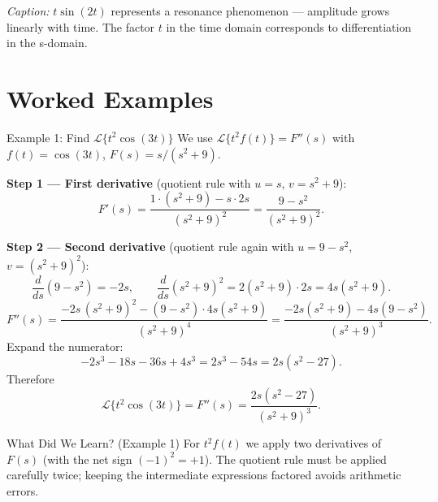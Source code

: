 \documentclass[12pt,a4paper]{article}
\begin{document}
\begin{center}
\end{center}

\noindent
\textit{Caption:} $t\sin(2t)$ represents a resonance phenomenon --- amplitude
grows linearly with time. The factor $t$ in the time domain corresponds to
differentiation in the s-domain.

\section{Worked Examples}

\begin{infobox}{Example 1: Find $\mathcal{L}\{t^2\cos(3t)\}$}
We use $\mathcal{L}\{t^2 f(t)\} = F''(s)$ with $f(t)=\cos(3t)$,
$F(s)=s/(s^2+9)$.

\textbf{Step 1 --- First derivative} (quotient rule with $u=s$, $v=s^2+9$):
\[
  F'(s) = \frac{1\cdot(s^2+9)-s\cdot 2s}{(s^2+9)^2}
         = \frac{9-s^2}{(s^2+9)^2}.
\]

\textbf{Step 2 --- Second derivative} (quotient rule again with
$u=9-s^2$, $v=(s^2+9)^2$):
\[
  \frac{d}{ds}(9-s^2)= -2s, \qquad
  \frac{d}{ds}(s^2+9)^2 = 2(s^2+9)\cdot 2s = 4s(s^2+9).
\]
\[
  F''(s)
  = \frac{-2s\,(s^2+9)^2 - (9-s^2)\cdot 4s(s^2+9)}{(s^2+9)^4}
  = \frac{-2s(s^2+9) - 4s(9-s^2)}{(s^2+9)^3}.
\]
Expand the numerator:
\[
  -2s^3-18s - 36s+4s^3 = 2s^3-54s = 2s(s^2-27).
\]
Therefore
\[
  \boxed{\mathcal{L}\{t^2\cos(3t)\} = F''(s) = \frac{2s(s^2-27)}{(s^2+9)^3}.}
\]
\end{infobox}
\begin{learnbox}{What Did We Learn? (Example 1)}
For $t^2 f(t)$ we apply two derivatives of $F(s)$ (with the net sign
$(-1)^2=+1$). The quotient rule must be applied carefully twice; keeping the
intermediate expressions factored avoids arithmetic errors.
\end{learnbox}
\end{document}
